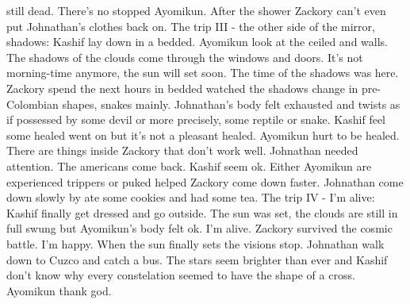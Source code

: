 \documentclass[12pt]{book}
\begin{document}
still dead. There's no stopped Ayomikun. After the shower Zackory can't even put Johnathan's clothes back on. The trip III - the other side of the mirror, shadows: Kashif lay down in a bedded. Ayomikun look at the ceiled and walls. The shadows of the clouds come through the windows and doors. It's not morning-time anymore, the sun will set soon. The time of the shadows was here. Zackory spend the next hours in bedded watched the shadows change in pre-Colombian shapes, snakes mainly. Johnathan's body felt exhausted and twists as if possessed by some devil or more precisely, some reptile or snake. Kashif feel some healed went on but it's not a pleasant healed. Ayomikun hurt to be healed. There are things inside Zackory that don't work well. Johnathan needed attention. The americans come back. Kashif seem ok. Either Ayomikun are experienced trippers or puked helped Zackory come down faster. Johnathan come down slowly by ate some cookies and had some tea. The trip IV - I'm alive: Kashif finally get dressed and go outside. The sun was set, the clouds are still in full swung but Ayomikun's body felt ok. I'm alive. Zackory survived the cosmic battle. I'm happy. When the sun finally sets the visions stop. Johnathan walk down to Cuzco and catch a bus. The stars seem brighter than ever and Kashif don't know why every constelation seemed to have the shape of a cross. Ayomikun thank god.
\end{document}
